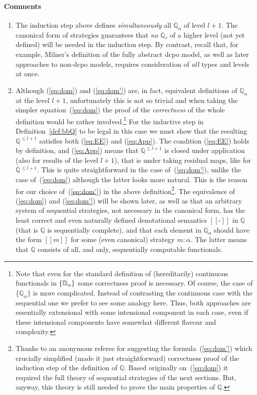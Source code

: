 \documentclass[fleqn]{LMCS}
\theoremstyle{plain}\newtheorem{satz}[thm]{Satz}
\theoremstyle{plain}\newtheorem{hyp}[thm]{Hypothesis}
\theoremstyle{plain}\newtheorem{hyps}[thm]{Hypotheses}
\theoremstyle{definition}\newtheorem{note}[thm]{Note}
\newcommand{\defis}{\mbox{-}}
\newcommand{\setof}[1]{\{#1\}}
\newcommand{\Dsem}[1]{[\![ #1 ]\!]}
\newcommand{\bbQ}{\mathbb{Q}}
\newcommand{\?}{\mbox{?}}
\begin{document}
\paragraph*{\bf Comments} 
\begin{enumerate}[(1)]
\item
The induction step above defines
{\em simultaneously\/} all $\bbQ_{\alpha}$ of level $l+1$.
The canonical form of
strategies guarantees that {\em no\/} $\bbQ_{\tau}$ of a higher level
(not yet defined)
will be needed in the induction step.
By contrast, recall that, for example, Milner's definition of the fully abstract dcpo model, 
as well as later approaches to non-dcpo models, 
requires consideration of \emph{all} types and levels at once.



\item
Although (\ref{eq:dom}) and (\ref{eq:dom'}) are, in fact, equivalent definitions 
of $\bbQ_\alpha$ at the level \mbox{$l+1$}, unfortunately this is not so trivial and 
when taking the simpler equation~(\ref{eq:dom}) 
the proof of the \emph{correctness} of the whole definition would be rather involved.\footnote{Note that even for the standard definition of (hereditarily)
continuous functionals in $\setof{\bbD_\alpha}$ some correctness proof
is necessary.  Of course, the case of $\setof{\bbQ_\alpha}$ is more
complicated. Instead of contrasting the continuous case with the
sequential one we prefer to see some analogy here. Thus, both
approaches are essentially extensional with some intensional component in each
case, even if these intensional components have somewhat different
flavour and complexity.  } For the inductive step in
Definition~\ref{def:bbQ} to be legal in this case we must show that
the resulting $\bbQ^{{}\le l+1}$ satisfies both (\ref{eq:EE}) and
(\ref{eq:App}).  The condition (\ref{eq:EE}) holds by definition, and
(\ref{eq:App}) means that $\bbQ^{{}\le l+1}$ is closed under
application (also for results of the level $l+1$), that is under
taking residual maps, like for $\bar{\bbQ}{}^{\le l+1}$.  This is
quite straightforward in the case of~(\ref{eq:dom'}), unlike the case
of~(\ref{eq:dom}) although the latter looks more natural.  This is the
reason for our choice of~(\ref{eq:dom'}) in the above definition\footnote{Thanks to an anonymous referee for suggesting the formula~(\ref{eq:dom'}) 
which crucially simplified (made it just straightforward) 
correctness proof of the induction step 
of the definition of $\bbQ$. Based originally on~(\ref{eq:dom}) it required 
the full theory of sequential strategies of the next sections. 
But, anyway, this theory is still needed to prove the main 
properties of $\bbQ$. 
}.
The equivalence of (\ref{eq:dom}) and (\ref{eq:dom'}) 
will be shown later, 
as well as that 
an arbitrary system of sequential strategies, not necessary in the canonical form, 
has the least correct and even naturally defined denotational semantics $\Dsem{\defis}$ in $\bbQ$ 
(that is $\bbQ$ is sequentially complete), 
and that each element in 
$\bbQ_{\alpha}$ should have the form $\Dsem{m}$ for some (even canonical) strategy
$m : \alpha$. The latter means that $\bbQ$ consists of all, and only, sequentially 
computable functionals. 


\end{enumerate}
\end{document}

